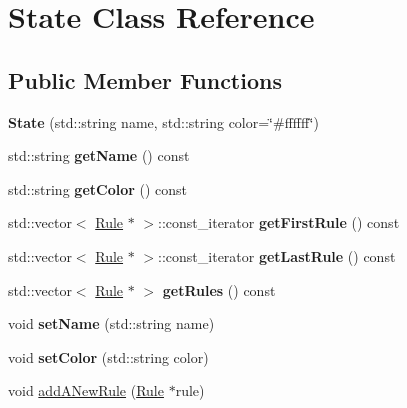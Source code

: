 \hypertarget{class_state}{}\section{State Class Reference}
\label{class_state}
\subsection*{Public Member Functions}
\begin{DoxyCompactItemize}
\item 
\mbox{\label{class_state_a95e905b285b951ae866c64c56adb0ab4}} 
{\bfseries State} (std\+::string name, std\+::string color=\char`\"{}\#ffffff\char`\"{})
\item 
\mbox{\label{class_state_a7aec8a3796220945cd69224d6980cfe4}} 
std\+::string {\bfseries get\+Name} () const
\item 
\mbox{\label{class_state_a18786bc143a74eed3c70afdac4581cbe}} 
std\+::string {\bfseries get\+Color} () const
\item 
\mbox{\label{class_state_ae768b6ec485cc35e47296946b2fd686b}} 
std\+::vector$<$ \mbox{\hyperlink{class_rule}{Rule}} $\ast$ $>$\+::const\+\_\+iterator {\bfseries get\+First\+Rule} () const
\item 
\mbox{\label{class_state_a155c445f8afd73f0de633ed0261ac368}} 
std\+::vector$<$ \mbox{\hyperlink{class_rule}{Rule}} $\ast$ $>$\+::const\+\_\+iterator {\bfseries get\+Last\+Rule} () const
\item 
\mbox{\label{class_state_a69d34bf17b5f37c12df6409c8d0a4f73}} 
std\+::vector$<$ \mbox{\hyperlink{class_rule}{Rule}} $\ast$ $>$ {\bfseries get\+Rules} () const
\item 
\mbox{\label{class_state_a4e008e0093650d4089a5b5d06edf27b0}} 
void {\bfseries set\+Name} (std\+::string name)
\item 
\mbox{\label{class_state_a2d5798b233e5a6f5926fe5fb664dc19c}} 
void {\bfseries set\+Color} (std\+::string color)
\item 
void \mbox{\hyperlink{class_state_ae180b397cb705b41ec417c34a46473dc}{add\+A\+New\+Rule}} (\mbox{\hyperlink{class_rule}{Rule}} $\ast$rule)

\end{DoxyCompactItemize}
